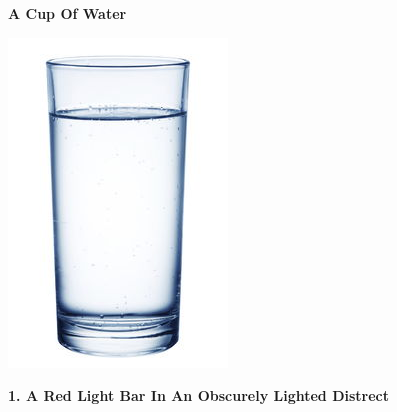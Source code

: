 \documentclass[]{article}
\begin{document}
\newpage

\begin{center}
	\Large\textbf{A Cup Of Water}
\end{center}

\begin{center}
	\includegraphics{water4}
\end{center}


\begin{center}
\large\textbf{1. A Red Light Bar In An \newline Obscurely Lighted Distrect}
\end{center}
\end{document}
